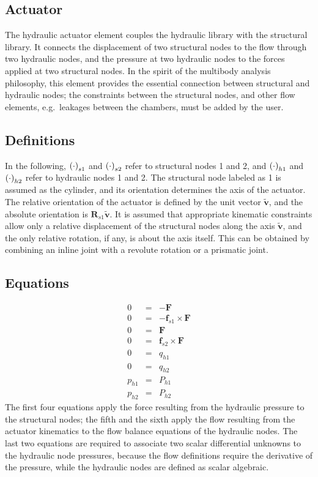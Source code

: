 \documentclass[10pt,dvips,fleqn]{report}
\newcommand{\T}[1]{\boldsymbol{#1}}
\begin{document}
\subsection{Actuator}
The hydraulic actuator element couples the hydraulic library 
with the structural library.
It connects the displacement of two structural nodes to the flow
through two hydraulic nodes, and the pressure at two hydraulic nodes
to the forces applied at two structural nodes.
In the spirit of the multibody analysis philosophy, this element
provides the essential connection between structural 
and hydraulic nodes; the constraints between the structural nodes, 
and other flow elements, e.g.\ leakages between the chambers, 
must be added by the user.

\subsection{Definitions}
In the following, $\left( \cdot \right)_{s1}$ and $\left( \cdot \right)_{s2}$
refer to structural nodes 1 and 2, 
and $\left( \cdot \right)_{h1}$ and $\left( \cdot \right)_{h2}$
refer to hydraulic nodes 1 and 2.
The structural node labeled as 1 is assumed as the cylinder,
and its orientation determines the axis of the actuator.
The relative orientation of the actuator is defined by the unit vector
$\T{\tilde{v}}$, and the absolute orientation is $\T{R}_{s1} \T{\tilde{v}}$.
It is assumed that appropriate kinematic constraints allow only 
a relative displacement of the structural nodes along 
the axis $\T{\tilde{v}}$, and the only relative rotation, 
if any, is about the axis itself.
This can be obtained by combining an inline joint with 
a revolute rotation or a prismatic joint.

\subsection{Equations}
\begin{eqnarray*}
	0 & = & -\T{F} \\
	0 & = & -\T{f}_{s1}\times\T{F} \\
	0 & = & \T{F} \\
	0 & = & \T{f}_{s2}\times\T{F} \\
	0 & = & q_{h1} \\
	0 & = & q_{h2} \\
	p_{h1} & = & P_{h1} \\
	p_{h2} & = & P_{h2}
\end{eqnarray*}
The first four equations apply the force resulting from the hydraulic 
pressure to the structural nodes; the fifth and the sixth apply 
the flow resulting from the actuator kinematics to the flow balance
equations of the hydraulic nodes.
The last two equations are required to associate two scalar
differential unknowns to the hydraulic node pressures, because 
the flow definitions require the derivative of the pressure, 
while the hydraulic nodes are defined as scalar algebraic.
\end{document}
